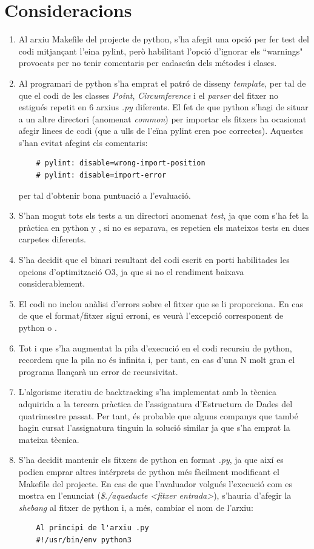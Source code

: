 \documentclass[12pt, letterpaper]{article}
\begin{document}
\section{Consideracions}
\begin{enumerate}
\item Al arxiu Makefile del projecte de python, s'ha afegit una opció per fer test del codi mitjançant l'eina pylint, però habilitant l'opció d'ignorar els ``warnings" provocats per no tenir comentaris per cadascún dels métodes i clases.
\item Al programari de python s'ha emprat el patró de disseny \textit{template}, per tal de que el codi de les classes \textit{Point}, \textit{Circumference} i el \textit{parser} del fitxer no estigués repetit en 6 arxius \textit{.py} diferents. El fet de que python s'hagi de situar a un altre directori (anomenat \textit{common}) per importar els fitxers ha ocasionat afegir linees de codi (que a ulls de l'eïna pylint eren poc correctes). Aquestes s'han evitat afegint els comentaris:
    \begin{verbatim}
    # pylint: disable=wrong-import-position
    # pylint: disable=import-error
    \end{verbatim}
    per tal d'obtenir bona puntuació a l'evaluació.
\item S'han mogut tots els tests a un directori anomenat \textit{test}, ja que com s'ha fet la pràctica en python y {\cpluspluslogo}, si no es separava, es repetien els mateixos tests en dues carpetes diferents.
\item S'ha decidit que el binari resultant del codi escrit en {\cpluspluslogo} porti habilitades les opcions d'optimització O3, ja que si no el rendiment baixava considerablement.
\item El codi no inclou anàlisi d'errors sobre el fitxer que se li proporciona. En cas de que el format/fitxer sigui erroni, es veurà l'excepció corresponent 
    de python o \cpluspluslogo.
\item Tot i que s'ha augmentat la pila d'execució en el codi recursiu de python, recordem que la pila no és infinita i, per tant, en cas d'una N molt gran el programa llançarà un error de recursivitat.
\item L'algorisme iteratiu de backtracking s'ha implementat amb la tècnica adquirida a la tercera pràctica de l'assignatura d'Estructura de Dades del quatrimestre passat. Per tant, és probable que 
    alguns companys que també hagin cursat l'assignatura tinguin la solució similar ja que s'ha emprat la mateixa tècnica.
\item S'ha decidit mantenir els fitxers de python en format \textit{.py}, ja que així es podien emprar altres intérprets de python més fàcilment modificant el Makefile del projecte. En cas de que l'avaluador volgués l'execució com es mostra 
    en l'enunciat (\textit{\$./aqueducte <fitxer entrada>}), s'hauria d'afegir la \textit{shebang} al fitxer de python i, a més, cambiar el nom de l'arxiu:
    \begin{verbatim}
    Al principi de l'arxiu .py
    #!/usr/bin/env python3


\end{verbatim}
\end{enumerate}
\end{document}
